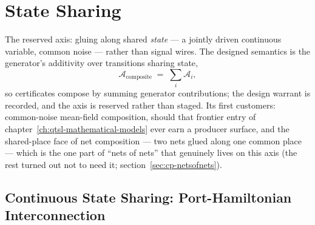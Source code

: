 

\section{State Sharing}
\label{sec:cp-stateshare}

The reserved axis: gluing along shared \emph{state} --- a jointly
driven continuous variable, common noise --- rather than signal
wires. The designed semantics is the generator's additivity over
transitions sharing state,
\[
\mathcal{A}_{\mathrm{composite}} \;=\; \sum_i \mathcal{A}_i,
\]
so certificates compose by summing generator contributions; the
design warrant is recorded, and the axis is reserved rather than
staged. Its first customers: common-noise mean-field composition,
should that frontier entry of chapter~\ref{ch:qtsl-mathematical-models} ever
earn a producer surface, and the shared-place face of net
composition --- two nets glued along one common place --- which is
the one part of ``nets of nets'' that genuinely lives on this axis
(the rest turned out not to need it;
section~\ref{sec:cp-netsofnets}).

\subsection{Continuous State Sharing: Port-Hamiltonian
  \texorpdfstring{\mbox{Interconnection}}{Interconnection}}

